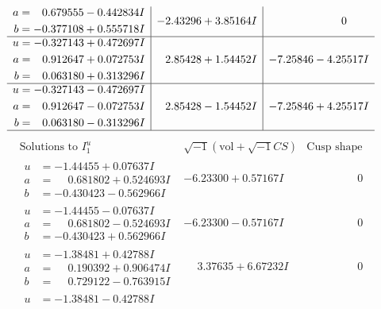 \documentclass[1p]{elsarticle_modified}
\theoremstyle{definition}
\newcommand{\I}{\sqrt{-1}}
\begin{document}
$$\begin{array}{c|c|c}
\begin{aligned}
a &= \phantom{-}0.679555 - 0.442834 I \\
b &= -0.377108 + 0.555718 I\end{aligned}
 & -2.43296 + 3.85164 I & \phantom{-0.000000 } 0 \\ \hline\begin{aligned}
u &= -0.327143 + 0.472697 I \\
a &= \phantom{-}0.912647 + 0.072753 I \\
b &= \phantom{-}0.063180 + 0.313296 I\end{aligned}
 & \phantom{-}2.85428 + 1.54452 I & -7.25846 - 4.25517 I \\ \hline\begin{aligned}
u &= -0.327143 - 0.472697 I \\
a &= \phantom{-}0.912647 - 0.072753 I \\
b &= \phantom{-}0.063180 - 0.313296 I\end{aligned}
 & \phantom{-}2.85428 - 1.54452 I & -7.25846 + 4.25517 I\\
 \hline 
 \end{array}$$\newpage$$\begin{array}{c|c|c}  
\text{Solutions to }I^u_{1}& \I (\text{vol} + \sqrt{-1}CS) & \text{Cusp shape}\\
 \hline 
\begin{aligned}
u &= -1.44455 + 0.07637 I \\
a &= \phantom{-}0.681802 + 0.524693 I \\
b &= -0.430423 - 0.562966 I\end{aligned}
 & -6.23300 + 0.57167 I & \phantom{-0.000000 } 0 \\ \hline\begin{aligned}
u &= -1.44455 - 0.07637 I \\
a &= \phantom{-}0.681802 - 0.524693 I \\
b &= -0.430423 + 0.562966 I\end{aligned}
 & -6.23300 - 0.57167 I & \phantom{-0.000000 } 0 \\ \hline\begin{aligned}
u &= -1.38481 + 0.42788 I \\
a &= \phantom{-}0.190392 + 0.906474 I \\
b &= \phantom{-}0.729122 - 0.763915 I\end{aligned}
 & \phantom{-}3.37635 + 6.67232 I & \phantom{-0.000000 } 0 \\ \hline\begin{aligned}
u &= -1.38481 - 0.42788 I \\

\end{aligned}
\end{array}$$
\end{document}
